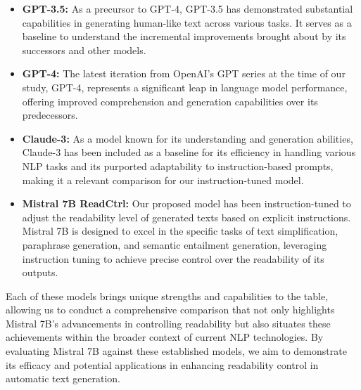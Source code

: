 \documentclass[11pt]{article}
\begin{document}
\begin{itemize}
[leftmargin=.1in,topsep=0.3pt]
\setlength\itemsep{0em}
\vspace{-0.2em}
    \item \textbf{GPT-3.5:} As a precursor to GPT-4, GPT-3.5 has demonstrated substantial capabilities in generating human-like text across various tasks. It serves as a baseline to understand the incremental improvements brought about by its successors and other models.
    
    \item \textbf{GPT-4:} The latest iteration from OpenAI's GPT series at the time of our study, GPT-4, represents a significant leap in language model performance, offering improved comprehension and generation capabilities over its predecessors.
    
    \item \textbf{Claude-3:} As a model known for its understanding and generation abilities, Claude-3 has been included as a baseline for its efficiency in handling various NLP tasks and its purported adaptability to instruction-based prompts, making it a relevant comparison for our instruction-tuned model.
    
    \item \textbf{Mistral 7B ReadCtrl:} Our proposed model has been instruction-tuned to adjust the readability level of generated texts based on explicit instructions. Mistral 7B is designed to excel in the specific tasks of text simplification, paraphrase generation, and semantic entailment generation, leveraging instruction tuning to achieve precise control over the readability of its outputs.
\end{itemize}

Each of these models brings unique strengths and capabilities to the table, allowing us to conduct a comprehensive comparison that not only highlights Mistral 7B's advancements in controlling readability but also situates these achievements within the broader context of current NLP technologies. By evaluating Mistral 7B against these established models, we aim to demonstrate its efficacy and potential applications in enhancing readability control in automatic text generation.\textbf{}

\end{document}
